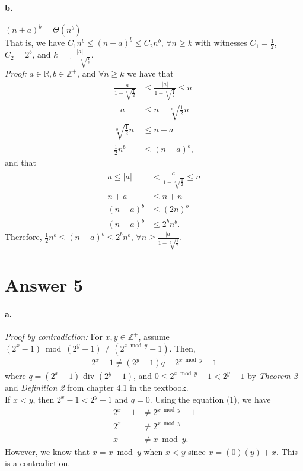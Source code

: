 \documentclass[11pt]{article}
\begin{document}
\paragraph{b.} $(n + a)^b = \Theta(n^b)$ \\
That is, we have $C_1 n^b \le (n + a)^b \le C_2 n^b$, $\forall n \ge k$ with witnesses $C_1 = \frac{1}{2}$, $C_2 = 2^b$, and $k = \frac{\left| a \right|}{1 - \sqrt[b]{\frac{1}{2}}}$. \\
\textit{Proof:} $a \in \mathbb{R}, b \in \mathbb{Z}^+$, and $\forall n \ge k$ we have that
\begin{align*}
    \frac{-a}{1 - \sqrt[b]{\frac{1}{2}}} &\le \frac{\left| a \right|}{1 - \sqrt[b]{\frac{1}{2}}} \le n \\
    -a &\le n - \sqrt[b]{\frac{1}{2}} n \\
    \sqrt[b]{\frac{1}{2}} n &\le n + a \\
    \frac{1}{2} n^b &\le (n + a)^b,
\end{align*}
and that
\begin{align*}
    a \le \left| a \right| &< \frac{\left| a \right|}{1 - \sqrt[b]{\frac{1}{2}}} \le n \\
    n + a &\le n + n \\
    (n + a)^b &\le (2n)^b \\
    (n + a)^b &\le 2^b n^b.
\end{align*}
Therefore, $\frac{1}{2} n^b \le (n + a)^b \le 2^b n^b$, $\forall n \ge \frac{\left| a \right|}{1 - \sqrt[b]{\frac{1}{2}}}$.

\newpage
\section*{Answer 5}
\paragraph{a.} \textit{Proof by contradiction:} For $x, y \in \mathbb{Z}^+$, assume $(2^x - 1) \bmod (2^y - 1) \neq (2^{x \bmod y} - 1)$. Then,
\begin{align}
    2^x - 1 \neq (2^y - 1)q + 2^{x \bmod y} - 1
\end{align}
where $q = (2^x - 1)$ div $(2^y - 1)$, and $0 \le 2^{x \bmod y} - 1 < 2^y - 1$ by \textit{Theorem 2} and \textit{Definition 2} from chapter 4.1 in the textbook. \\

\noindent If $x < y$, then $2^x - 1 < 2^y - 1$ and $q = 0$. Using the equation (1), we have
\begin{align*}
    2^x - 1 &\neq 2^{x \bmod y} - 1 \\
    2^x &\neq 2^{x \bmod y} \\
    x &\neq x \bmod y.
\end{align*}
However, we know that $x = x \bmod y$ when $x < y$ since $x = (0)(y) + x$. This is a contradiction. \\
\end{document}
